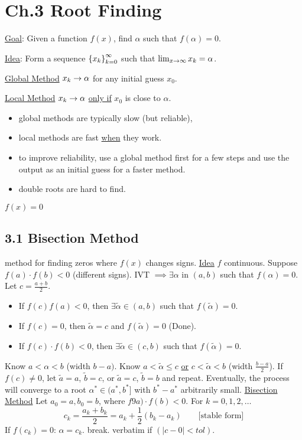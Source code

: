 \documentclass[]{article}
\begin{document}
\section*{Ch.3 Root Finding}

\ul{Goal}: Given a function $f(x)$, find $\alpha$ such that $f(\alpha)=0$.

\ul{Idea}: Form a sequence $\left\{ x_k \right\}_{k=0}^\infty$ such that $\lim_{x\rightarrow\infty}x_k=\alpha$.

\ul{Global Method} $x_k\rightarrow\alpha$ for any initial guess $x_0$.

\ul{Local Method} $x_k\rightarrow\alpha$ \ul{only if} $x_0$ is close to $\alpha$.

\begin{itemize}
	\item global methods are typically slow (but reliable),
	\item local methods are fast \ul{when} they work.
	\item to improve reliability, use a global method first for a few steps and use the output as an initial guess for a faster method.
	\item double roots are hard to find.
\end{itemize}

$f(x) = 0$

\subsection*{3.1 Bisection Method}

 method for finding zeros where $f(x)$ changes signs.
\ul{Idea} $f$ continuous.
Suppose $f(a)\cdot f(b)<0$ (different signs).
IVT $\implies \exists\alpha$ in $(a,b)$ such that $f(\alpha)=0$.
Let $c=\frac{a+b}2$.
\begin{itemize}
	\item If $f(c)f(a)<0$, then $\exists\tilde\alpha\in(a,b)$ such that $f(\tilde\alpha)=0$.
	\item If $f(c)=0$, then $\tilde\alpha=c$ and $f(\tilde\alpha)=0$ (Done).
	\item If $f(c)\cdot f(b)<0$, then $\exists\tilde\alpha\in(c,b)$ such that $f(\tilde\alpha)=0$.
\end{itemize}
Know $a<\alpha<b$ (width $b-a)$.
Know $a<\tilde\alpha\leq c$ \ul{or} $c<\tilde\alpha<b$ (width $\frac{b-a}2$).
If $f(c)\neq0$, let $\tilde a=a$, $\tilde b=c$, or $\tilde a =c$, $\tilde b=b$ and repeat.
Eventually, the process will converge to a root $\alpha^*\in(a^*,b^*]$ with $b^*-a^*$ arbitrarily small.
\ul{Bisection Method} Let $a_0=a,b_0=b$, where $f9a)\cdot f(b)<0$.
For $k=0,1,2,\dots$
$$ c_k = \frac{a_k+b_k}2 = a_k + \frac12(b_k-a_k) \qquad \text{[stable form]} $$
If $f(c_k)=0$: $\alpha=c_k$. break. verbatim if $(|c-0|<tol)$.
\end{document}
